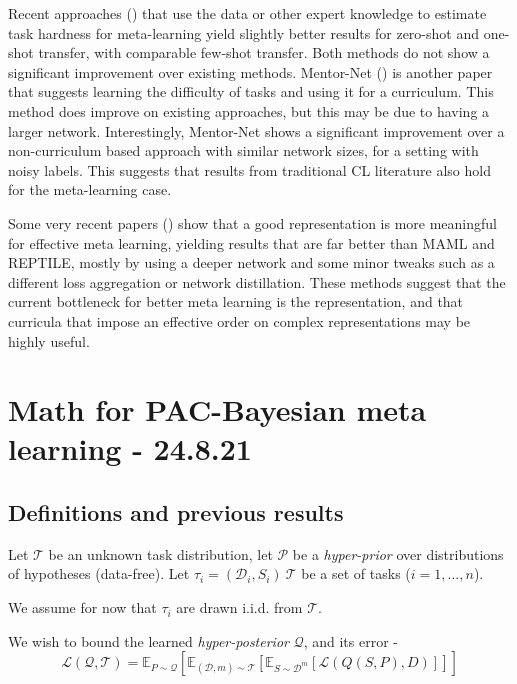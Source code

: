 \documentclass[letterpaper]{article}
\theoremstyle{definition}
\begin{document}
Recent approaches (\cite{Saglietti2021, Khodak2019}) that use the data or other expert knowledge to estimate task hardness for meta-learning yield slightly better results for zero-shot and one-shot transfer, with comparable few-shot transfer. 
Both methods do not show a significant improvement over existing methods.
Mentor-Net (\cite{Jiang2017}) is another paper that suggests learning the difficulty of tasks and using it for a curriculum. This method does improve on existing approaches, but this may be due to having a larger network.
Interestingly, Mentor-Net shows a significant improvement over a non-curriculum based approach with similar network sizes, for a setting with noisy labels. This suggests that results from traditional CL literature also hold for the meta-learning case.

Some very recent papers (\cite{Bateni2020, Tian2020}) show that a good representation is more meaningful for effective meta learning, yielding results that are far better than MAML and REPTILE, mostly by using a deeper network and some minor tweaks such as a different loss aggregation or network distillation. 
These methods suggest that the current bottleneck for better meta learning is the representation, and that curricula that impose an effective order on complex representations may be highly useful.

\section{Math for PAC-Bayesian meta learning - 24.8.21} \label{sec:bayes}

\subsection{Definitions and previous results} 

Let $\mathcal{T}$ be an unknown task distribution, let $\mathcal{P}$ be a \emph{hyper-prior} over distributions of hypotheses (data-free). Let $\tau_i=(\mathcal{D}_i, S_i)~\mathcal{T}$ be a set of tasks ($i=1,...,n$).

We assume for now that $\tau_i$ are drawn i.i.d. from $\mathcal{T}$.

We wish to bound the learned \emph{hyper-posterior} $\mathcal{Q}$, and its error - 
$$\mathcal{L}(\mathcal{Q}, \mathcal{T})=\mathbb{E}_{P\sim \mathcal{Q}}[\mathbb{E}_{(\mathcal{D}, m)\sim \mathcal{T}}[\mathbb{E}_{S\sim \mathcal{D}^m}[\mathcal{L}(Q(S,P), D)]]]$$
\end{document}
